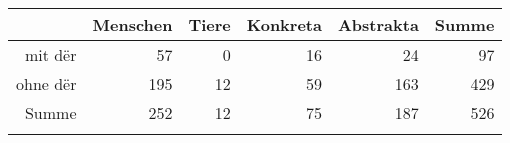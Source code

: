 \begin{tabular}{rrrrrr}
  \lsptoprule
 & Menschen & Tiere & Konkreta & Abstrakta & Summe \\ 
  \midrule
mit dër & 57 & 0 & 16 & 24 & 97 \\ 
  ohne dër & 195 & 12 & 59 & 163 & 429 \\ 
  Summe & 252 & 12 & 75 & 187 & 526 \\ 
   \lspbottomrule
\end{tabular}
